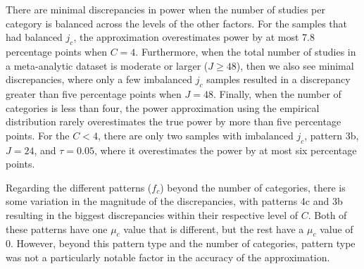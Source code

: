 There are minimal discrepancies in power when the number of studies per category is balanced across the levels of the other factors. For the samples that had balanced $j_c$, the approximation overestimates power by at most 7.8 percentage points when $ C=4$. Furthermore, when the total number of studies in a meta-analytic dataset is moderate or larger ($J \geq 48$), then we also see minimal discrepancies, where only a few imbalanced $j_c$ samples resulted in a discrepancy greater than five percentage points when $J = 48$. Finally, when the number of categories is less than four, the power approximation using the empirical distribution rarely overestimates the true power by more than five percentage points. For the $C < 4$, there are only two samples with imbalanced $j_c$, pattern 3b, $J=24$, and $\tau = 0.05$, where it overestimates the power by at most six percentage points.


Regarding the different patterns ($f_c$) beyond the number of categories, there is some variation in the magnitude of the discrepancies, with patterns 4c and 3b resulting in the biggest discrepancies within their respective level of $C$. Both of these patterns have one $\mu_c$ value that is different, but the rest have a $\mu_c$ value of 0. However, beyond this pattern type and the number of categories, pattern type was not a particularly notable factor in the accuracy of the approximation.  

